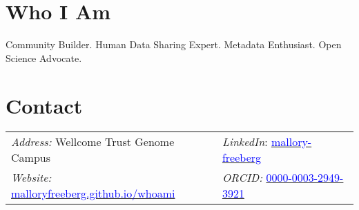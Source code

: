 \documentclass[margin,line]{res}
\begin{document}
\begin{resume}

\section{\sc Who I Am}
Community Builder. Human Data Sharing Expert. Metadata Enthusiast. Open Science Advocate.

\section{\sc Contact}
\begin{tabular}{@{}p{3in}p{3in}} %
{\it Address:} Wellcome Trust Genome Campus & {\em LinkedIn}: \href{https://www.linkedin.com/in/mallory-freeberg/}{\textcolor{blue}{mallory-freeberg}} \\
{\em Website:} \href{https://malloryfreeberg.github.io/whoami/}{\textcolor{blue}{malloryfreeberg.github.io/whoami}} & {\em ORCID:} \href{https://orcid.org/0000-0003-2949-3921}{\textcolor{blue}{0000-0003-2949-3921}} \\
\end{tabular}



\end{resume}
\end{document}
